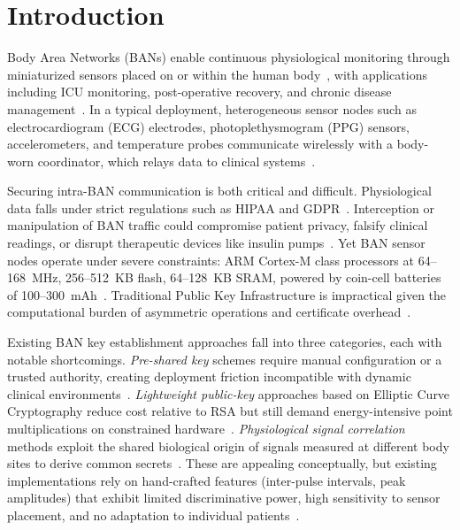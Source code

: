 \documentclass[sensors,article,submit,pdftex,moreauthors]{Definitions/mdpi}
\begin{document}
\section{Introduction}
\label{sec:introduction}

Body Area Networks (BANs) enable continuous physiological monitoring through miniaturized sensors placed on or within the human body~\cite{movassaghi2014wireless, cao2009enabling}, with applications including ICU monitoring, post-operative recovery, and chronic disease management~\cite{al2017body}. In a typical deployment, heterogeneous sensor nodes such as electrocardiogram (ECG) electrodes, photoplethysmogram (PPG) sensors, accelerometers, and temperature probes communicate wirelessly with a body-worn coordinator, which relays data to clinical systems~\cite{chen2011body}.

Securing intra-BAN communication is both critical and difficult. Physiological data falls under strict regulations such as HIPAA and GDPR~\cite{li2010data}. Interception or manipulation of BAN traffic could compromise patient privacy, falsify clinical readings, or disrupt therapeutic devices like insulin pumps~\cite{rushanan2014sok}. Yet BAN sensor nodes operate under severe constraints: ARM Cortex-M class processors at 64--168~MHz, 256--512~KB flash, 64--128~KB SRAM, powered by coin-cell batteries of 100--300~mAh~\cite{zhang2017security}. Traditional Public Key Infrastructure is impractical given the computational burden of asymmetric operations and certificate overhead~\cite{kompara2018survey}.

Existing BAN key establishment approaches fall into three categories, each with notable shortcomings. \textit{Pre-shared key} schemes require manual configuration or a trusted authority, creating deployment friction incompatible with dynamic clinical environments~\cite{eschenauer2002random}. \textit{Lightweight public-key} approaches based on Elliptic Curve Cryptography reduce cost relative to RSA but still demand energy-intensive point multiplications on constrained hardware~\cite{chan2003random}. \textit{Physiological signal correlation} methods exploit the shared biological origin of signals measured at different body sites to derive common secrets~\cite{poon2006novel, venkatasubramanian2010pska, rostami2013heart}. These are appealing conceptually, but existing implementations rely on hand-crafted features (inter-pulse intervals, peak amplitudes) that exhibit limited discriminative power, high sensitivity to sensor placement, and no adaptation to individual patients~\cite{xu2017walkie}.
\end{document}
